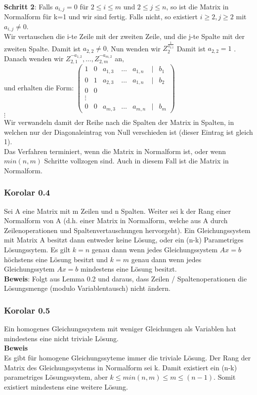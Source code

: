 \documentclass{scrartcl}
\begin{document}
\)\\
\textbf{Schritt 2}: Falls \(a_{i,j} = 0\) f\"ur \(2 \le i \le m\) und \(2 \le j \le n\), so ist die Matrix in Normalform f\"ur k=1 und wir sind fertig. Falls nicht, so existiert \(i \ge 2, j\ge 2\) mit \(a_{i,j} \neq 0\).\\
Wir vertauschen die i-te Zeile mit der zweiten Zeile, und die j-te Spalte mit der zweiten Spalte. Damit ist \(a_{2,2} \neq 0\). Nun wenden wir \(Z_{2}^{\frac{1}{a_{2,2}}}\) Damit ist \(a_{2,2} = 1\) . Danach wenden wir \(Z_{2,1}^{-a_{1,2}}, \dots, Z_{2,m}^{-a_{m,2}}\) an,\\ und erhalten die Form:
\(
\begin{pmatrix}
1 & 0 & a_{1, 3} & \dots & a_{1, n} &|& b_1\\
0 & 1 & a_{2, 3} & \dots & a_{1, n} &|& b_2\\
0 & 0\\
\vdots\\
0 & 0 & a_{m, 3} & \dots & a_{m, n} &|& b_m
\end{pmatrix}
\)\\
\(\vdots\)\\
Wir verwandeln damit der Reihe nach die Spalten der Matrix in Spalten, in welchen nur der Diagonaleintrag von Null verschieden ist (dieser Eintrag ist gleich 1).\\
Das Verfahren terminiert, wenn die Matrix in Normalform ist, oder wenn \(min(n, m)\) Schritte vollzogen sind. Auch in diesem Fall ist die Matrix in Normalform.

\subsubsection{Korolar 0.4}
Sei A eine Matrix  mit m Zeilen und n Spalten. Weiter sei k der Rang einer Normalform von A (d.h. einer Matrix in Normalform, welche aus A durch Zeilenoperationen und Spaltenvertauschungen hervorgeht). Ein Gleichungssystem  mit Matrix A besitzt dann entweder keine L\"osung, oder ein (n-k) Parametriges L\"osungssytem. Es gilt \(k=n\) genau dann wenn jedes Gleichungssystem \(Ax=b\) h\"ochstens eine L\"osung besitzt und \(k=m\) genau dann wenn jedes Gleichungssytem \(Ax=b\) mindestens eine L\"osung besitzt.\\
\textbf{Beweis}: Folgt aus Lemma 0.2 und daraus, dass Zeilen / Spaltenoperationen die L\"osungsmenge (modulo Variablentausch) nicht \"andern.

\subsubsection{Korolar 0.5}
Ein homogenes Gleichungssystem mit weniger Gleichungen als Variablen hat mindestens eine nicht triviale L\"osung.\\
\textbf{Beweis}\\
Es gibt f\"ur homogene Gleichungssyteme immer die triviale L\"osung. Der Rang der Matrix des Gleichungssystems in Normalform sei k. Damit existiert ein (n-k) parametriges L\"osungssystem, aber \(k \le min(n, m) \le m \le (n-1)\). Somit existiert mindestens eine weitere L\"osung.\\
\end{document}

